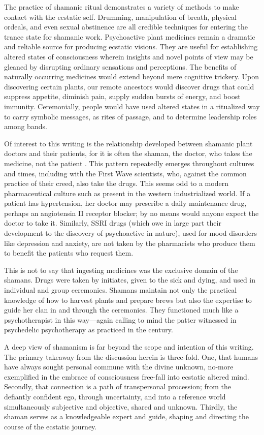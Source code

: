 \documentclass{UIdahoMastersThesis}
\begin{document}
The practice of shamanic ritual demonstrates a variety of methods to make contact with the ecstatic self. Drumming, manipulation of breath, physical ordeals, and even sexual abstinence are all credible techniques for entering the trance state for shamanic work. Psychoactive plant medicines remain a dramatic and reliable source for producing ecstatic visions. They are useful for establishing altered states of consciousness wherein insights and novel points of view may be gleaned by disrupting ordinary sensations and perceptions. The benefits of naturally occurring medicines would extend beyond mere cognitive trickery. Upon discovering certain plants, our remote ancestors would discover drugs that could suppress appetite, diminish pain, supply sudden bursts of energy, and boost immunity. Ceremonially, people would have used altered states in a ritualized way to carry symbolic messages, as rites of passage, and to determine leadership roles among bands.

Of interest to this writing is the relationship developed between shamanic plant doctors and their patients, for it is often the shaman, the doctor, who takes the medicine, not the patient \cite{eliade_shamanism_2004}. This pattern repeatedly emerges throughout cultures and times, including with the First Wave scientists, who, against the common practice of their creed, also take the drugs. This seems odd to a modern pharmaceutical culture such as present in the western industrialized world. If a patient has hypertension, her doctor may prescribe a daily maintenance drug, perhaps an angiotensin II receptor blocker; by no means would anyone expect the doctor to take it. Similarly, SSRI drugs (which owe in large part their development to the discovery of psychoactive in nature), used for mood disorders like depression and anxiety, are not taken by the pharmacists who produce them to benefit the patients who request them.

This is not to say that ingesting medicines was the exclusive domain of the shamans. Drugs were taken by initiates, given to the sick and dying, and used in individual and group ceremonies. Shamans maintain not only the practical knowledge of how to harvest plants and prepare brews but also the expertise to guide her clan in and through the ceremonies. They functioned much like a psychotherapist in this way---again calling to mind the patter witnessed in psychedelic psychotherapy as practiced in the  century. 

A deep view of shamanism is far beyond the scope and intention of this writing. The primary takeaway from the discussion herein is three-fold. One, that humans have always sought personal commune with the divine unknown, no-more exemplified in the embrace of consciousness free-fall into ecstatic altered mind. Secondly, that connection is a path of transpersonal procession; from the defiantly confident ego, through uncertainty, and into a reference world simultaneously subjective and objective, shared and unknown. Thirdly, the shaman serves as a knowledgeable expert and guide, shaping and directing the course of the ecstatic journey.
\end{document}
